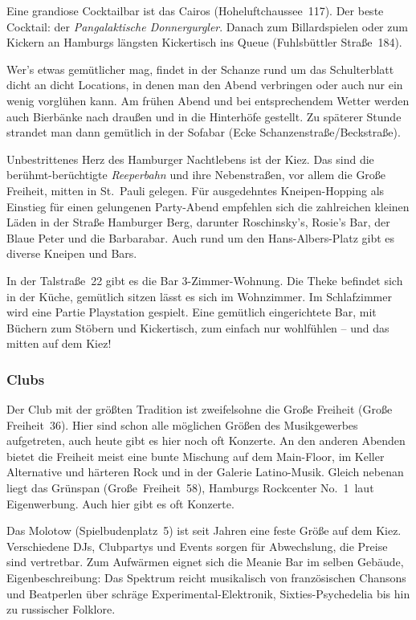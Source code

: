 \begin{advice}
Eine grandiose Cocktailbar ist das Cairos (Hoheluftchaussee~117). Der beste
Cocktail: der \emph{Pangalaktische Donnergurgler}. Danach zum Billardspielen
oder zum Kickern an Hamburgs längsten Kickertisch ins Queue (Fuhlsbüttler
Straße~184).
\end{advice}

Wer's etwas gemütlicher mag, findet in der Schanze rund um das Schulterblatt
dicht an dicht Locations, in denen man den Abend verbringen oder auch nur ein
wenig vorglühen kann. Am frühen Abend und bei entsprechendem Wetter werden auch
Bierbänke nach draußen und in die Hinterhöfe gestellt. Zu späterer Stunde
strandet man dann gemütlich in der Sofabar (Ecke Schanzenstraße/Beckstraße).

Unbestrittenes Herz des Hamburger Nachtlebens ist der Kiez. Das sind die
berühmt-berüchtigte \emph{Reeperbahn} und ihre Nebenstraßen, vor allem die
Große Freiheit, mitten in St.~Pauli gelegen. Für ausgedehntes Kneipen-Hopping
als Einstieg für einen gelungenen Party-Abend empfehlen sich die zahlreichen
kleinen Läden in der Straße Hamburger Berg, darunter Roschinsky's, Rosie's Bar,
der Blaue Peter und die Barbarabar. Auch rund um den Hans-Albers-Platz gibt es
diverse Kneipen und Bars.

\begin{advice}
In der Talstraße~22 gibt es die Bar 3-Zimmer-Wohnung. Die Theke befindet sich
in der Küche, gemütlich sitzen lässt es sich im Wohnzimmer. Im Schlafzimmer
wird eine Partie Playstation gespielt. Eine gemütlich eingerichtete Bar, mit
Büchern zum Stöbern und Kickertisch, zum einfach nur wohlfühlen -- und das
mitten auf dem Kiez!
\end{advice}

\subsubsection{Clubs}

Der Club mit der größten Tradition ist zweifelsohne die Große Freiheit (Große
Freiheit~36). Hier sind schon alle möglichen Größen des Musikgewerbes
aufgetreten, auch heute gibt es hier noch oft Konzerte. An den anderen Abenden
bietet die Freiheit meist eine bunte Mischung auf dem Main-Floor, im Keller
Alternative und härteren Rock und in der Galerie Latino-Musik. Gleich nebenan
liegt das Grünspan (Große~Freiheit~58), \glqq Hamburgs Rockcenter No.~1\grqq\ 
laut Eigenwerbung. Auch hier gibt es oft Konzerte.

Das Molotow (Spielbudenplatz~5) ist seit Jahren eine feste Größe auf dem Kiez.
Verschiedene DJs, Clubpartys und Events sorgen für Abwechslung, die Preise sind
vertretbar. Zum Aufwärmen eignet sich die Meanie Bar im selben Gebäude,
Eigenbeschreibung: \glqq Das Spektrum reicht musikalisch von französischen
Chansons und Beatperlen über schräge Experimental-Elektronik,
Sixties-Psychedelia bis hin zu russischer Folklore.\grqq

